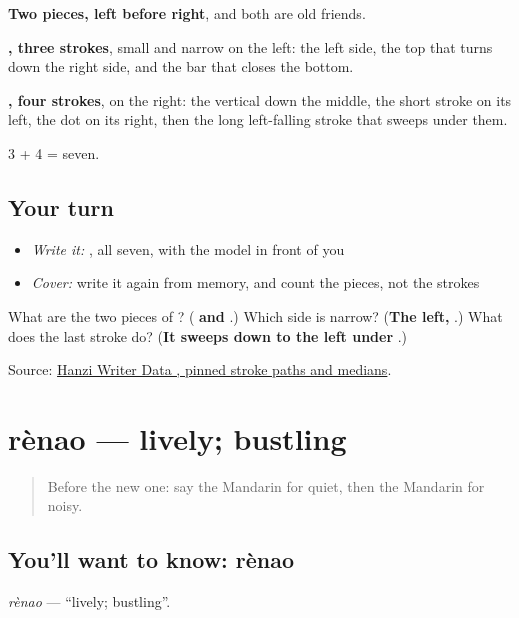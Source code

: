 \begin{quote}
\end{quote}

\textbf{Two pieces, left before right}, and both are old friends.

\textbf{, three strokes}, small and narrow on the left: the left side, the top that turns down the right side, and the bar that closes the bottom.

\textbf{, four strokes}, on the right: the vertical down the middle, the short stroke on its left, the dot on its right, then the long left-falling stroke that sweeps under them.

3 + 4 = seven.

\subsection*{Your turn}
\begin{itemize}
\raggedright
  \item \emph{Write it:} , all seven, with the model in front of you
  \item \emph{Cover:} write it again from memory, and count the pieces, not the strokes
\end{itemize}

\begin{tcolorbox}[breakable,colback=teal!4,colframe=teal!35!black,title={Before you move on}]
What are the two pieces of ? (\textbf{ and }.) Which side is narrow? (\textbf{The left, }.) What does the last stroke do? (\textbf{It sweeps down to the left under }.)

Source: \href{https://raw.githubusercontent.com/chanind/hanzi-writer-data/68d10a4b21150cae5e1ebbd223eed289cf32d90c/data/\%E5\%90\%B5.json}{Hanzi Writer Data , pinned stroke paths and medians}.
\end{tcolorbox}
\section[rènao]{rènao — lively; bustling}

\label{lesson:ZH-C129-renao}



\begin{quote}
Before the new one: say the Mandarin for quiet, then the Mandarin for noisy.
\end{quote}

\subsection*{You'll want to know: rènao}
\emph{rènao} — \textquotedblleft{}lively; bustling\textquotedblright{}.

